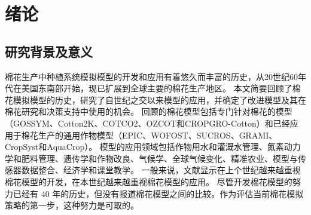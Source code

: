 \chapter{绪论}\label{chap:intro}
\section{研究背景及意义}

棉花生产中种植系统模拟模型的开发和应用有着悠久而丰富的历史，从20世纪60年代在美国东南部开始，现已扩展到全球主要的棉花生产地区。%
本文简要回顾了棉花模拟模型的历史，研究了自世纪之交以来模型的应用，并确定了改进模型及其在棉花研究和决策支持中使用的机会。%
回顾的棉花模型包括专门针对棉花的模型（GOSSYM、Cotton2K、COTCO2、OZCOT和CROPGRO-Cotton）和已经应用于棉花生产的通用作物模型（EPIC、WOFOST、SUCROS、GRAMI、CropSyst和AquaCrop）。%
模型的应用领域包括作物用水和灌溉水管理、氮素动力学和肥料管理、遗传学和作物改良、气候学、全球气候变化、精准农业、模型与传感器数据整合、经济学和课堂教学。%
一般来说，文献显示在上个世纪越来越重视棉花模型的开发，在本世纪越来越重视棉花模型的应用。%
尽管开发棉花模型的努力已经有 40 年的历史，但没有报道棉花模型之间的比较。作为评估当前棉花模拟策略的第一步，这种努力是可取的。%
